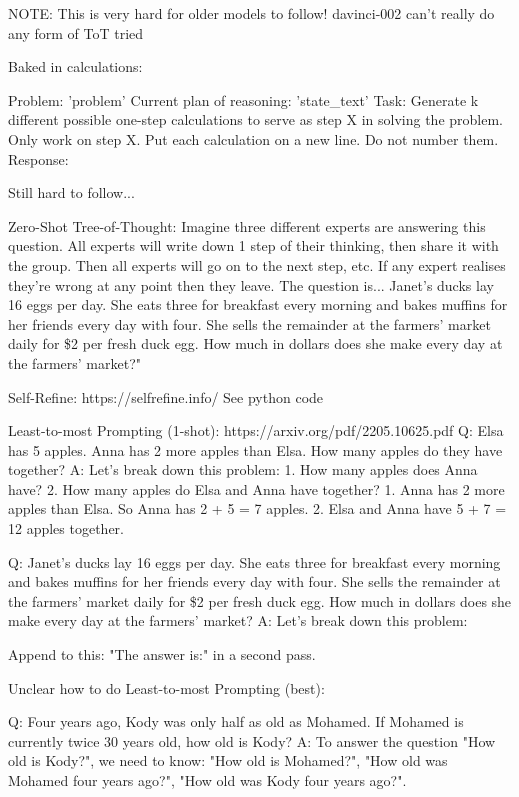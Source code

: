 \documentclass[11pt]{article}
\begin{document}
NOTE: This is very hard for older models to follow! davinci-002 can't really do any form of ToT tried

Baked in calculations:

Problem:
'{problem}' 
Current plan of reasoning:
'{state_text}'
Task:
Generate {k} different possible one-step calculations to serve as step {X} in solving the problem. Only work on step {X}. Put each calculation on a new line. Do not number them.
Response:

Still hard to follow...

Zero-Shot Tree-of-Thought:
Imagine three different experts are answering this question.
All experts will write down 1 step of their thinking,
then share it with the group.
Then all experts will go on to the next step, etc.
If any expert realises they're wrong at any point then they leave.
The question is...
Janet's ducks lay 16 eggs per day. She eats three for breakfast every morning and bakes muffins for her friends every day with four. She sells the remainder at the farmers' market daily for \$2 per fresh duck egg. How much in dollars does she make every day at the farmers' market?"

Self-Refine: https://selfrefine.info/
See python code

Least-to-most Prompting (1-shot): https://arxiv.org/pdf/2205.10625.pdf
Q: Elsa has 5 apples. Anna has 2 more apples than Elsa. How many apples do they have together?
A: Let's break down this problem: 1. How many apples does Anna have? 2. How many apples do Elsa and Anna have together?
1. Anna has 2 more apples than Elsa. So Anna has 2 + 5 = 7 apples.
2. Elsa and Anna have 5 + 7 = 12 apples together.

Q: Janet's ducks lay 16 eggs per day. She eats three for breakfast every morning and bakes muffins for her friends every day with four. She sells the remainder at the farmers' market daily for \$2 per fresh duck egg. How much in dollars does she make every day at the farmers' market?
A: Let's break down this problem:

Append to this: "The answer is:" in a second pass.

Unclear how to do Least-to-most Prompting (best):

Q: Four years ago, Kody was only half as old as Mohamed. If Mohamed is currently twice 30 years
old, how old is Kody?
A: To answer the question "How old is Kody?", we need to know: "How old is Mohamed?", "How
old was Mohamed four years ago?", "How old was Kody four years ago?".
\end{document}
